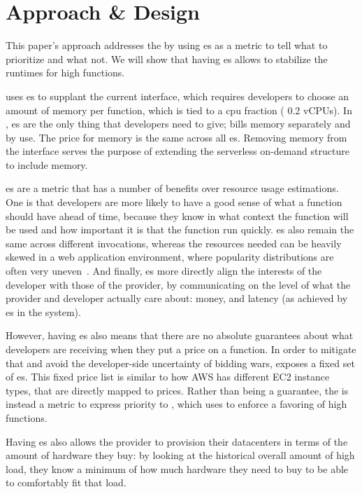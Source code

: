 \section{Approach \& Design}\label{design}

This paper's approach addresses the \problem{} by using \priceclass{}es as a
metric to tell \sys{} what to prioritize and what not. We will show that having
\priceclass{}es allows \sys{} to stabilize the runtimes for high \class{}
functions. 

\Sys{} uses \class{}es to supplant the current interface, which requires
developers to choose an amount of memory per function, which is tied to a cpu
fraction (\eg{} 0.2 vCPUs). In \sys{}, \priceclass{}es are the only thing
that developers need to give; \sys{} bills memory separately and by use. The
price for memory is the same across all \class{}es. Removing memory from the
interface serves the purpose of extending the serverless on-demand structure to
include memory.

\Priceclass{}es are a metric that has a number of benefits over resource usage
estimations. One is that developers are more likely to have a good sense of what
\priceclass{} a function should have ahead of time, because they know in what
context the function will be used and how important it is that the function run
quickly. \Priceclass{}es also remain the same across different invocations,
whereas the resources needed can be heavily skewed in a web application
environment, where popularity distributions are often very
uneven~\cite{hermod,serverless-in-the-wild}. And finally, \class{}es more
directly align the interests of the developer with those of the provider, by
communicating on the level of what the provider and developer actually care
about: money, and latency (as achieved by \class{}es in the system).

However, having \priceclass{}es also means that there are no absolute guarantees
about what developers are receiving when they put a price on a function. In
order to mitigate that and avoid the developer-side uncertainty of bidding wars,
\sys{} exposes a fixed set of \priceclass{}es. This fixed price list is similar
to how AWS has different EC2 instance types, that are directly mapped to prices.
Rather than being a guarantee, the \priceclass{} is instead a metric to express
priority to \sys{}, which \sys{} uses to enforce a favoring of high \class{}
functions.

Having \priceclass{}es also allows the provider to provision their datacenters
in terms of the amount of hardware they buy: by looking at the historical
overall amount of high \priceclass{} load, they know a minimum of how much
hardware they need to buy to be able to comfortably fit that load.


